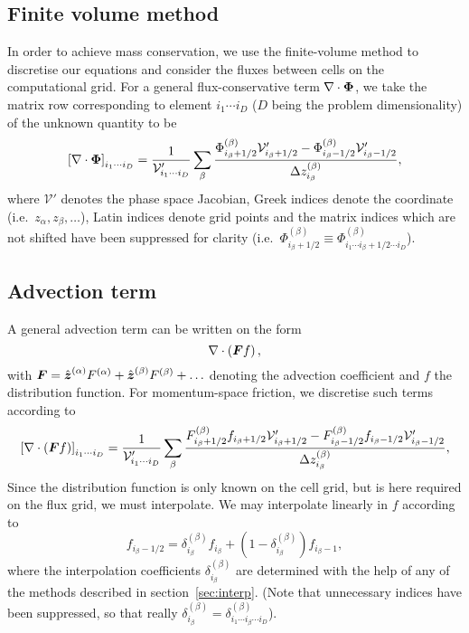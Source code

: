 \documentclass{notes}
\newcommand{\Vp}{\mathcal{V}'}
\begin{document}
    \subsection{Finite volume method}
    In order to achieve mass conservation, we use the finite-volume method to
    discretise our equations and consider the fluxes between cells on the
    computational grid. For a general flux-conservative term
    $\nabla\cdot\boldsymbol{\Phi}$, we take the matrix row corresponding to element
    $i_1\cdots i_D$ ($D$ being the problem dimensionality) of the unknown
    quantity to be
    \begin{equation}
        \left[ \nabla\cdot\bb{\Phi} \right]_{i_1\cdots i_D}  =
            \frac{1}{\Vp_{i_1\cdots i_D}}\sum_\beta \frac{
                \Phi^{(\beta)}_{i_\beta+1/2} \Vp_{i_\beta+1/2} -
                \Phi^{(\beta)}_{i_\beta-1/2} \Vp_{i_\beta-1/2}
            }{\Delta z^{(\beta)}_{i_\beta}},
    \end{equation}
    where $\Vp$ denotes the phase space Jacobian, Greek indices denote the
    coordinate (i.e.\ $z_\alpha, z_\beta, \ldots$), Latin indices denote grid
    points and the matrix indices which are not shifted have been suppressed for
    clarity (i.e.\
    $\Phi^{(\beta)}_{i_\beta+1/2}\equiv\Phi^{(\beta)}_{i_1\cdots i_\beta+1/2\cdots i_D}$).

    \subsection{Advection term}\label{sec:advection}
    A general advection term can be written on the form
    \begin{equation*}
        \nabla\cdot\left( \boldsymbol{F} f \right),
    \end{equation*}
    with $\boldsymbol{F} = \hat{\boldsymbol{z}}^{(\alpha)}F^{(\alpha)} + \hat{\boldsymbol{z}}^{(\beta)}F^{(\beta)}+\ldots$
    denoting the advection coefficient and $f$ the distribution function. For
    momentum-space friction, we discretise such terms according to
    \begin{equation}\label{eq:advection:discr}
        \left[\nabla\cdot\left( \bb{F}f \right) \right]_{i_1\cdots i_D} =
            \frac{1}{\Vp_{i_1\cdots i_D}}\sum_\beta \frac{
                F^{(\beta)}_{i_\beta+1/2}f_{i_\beta+1/2} \Vp_{i_\beta+1/2} -
                F^{(\beta)}_{i_\beta-1/2}f_{i_\beta-1/2} \Vp_{i_\beta-1/2}
            }{\Delta z^{(\beta)}_{i_\beta}},
    \end{equation}
    Since the distribution function is only known on the cell grid, but is here
    required on the flux grid, we must interpolate. We may interpolate linearly in
    $f$ according to
    \begin{equation}
        f_{i_\beta-1/2} = \delta^{(\beta)}_{i_\beta} f_{i_\beta} + \left( 1 - \delta^{(\beta)}_{i_\beta} \right) f_{i_\beta-1},
    \end{equation}
    where the interpolation coefficients $\delta^{(\beta)}_{i_\beta}$ are
    determined with the help of any of the methods described in
    section~\ref{sec:interp}. (Note that unnecessary indices have been
    suppressed, so that really
    $\delta^{(\beta)}_{i_\beta} = \delta^{(\beta)}_{i_1\cdots i_\beta\cdots i_D}$).
    
\end{document}
